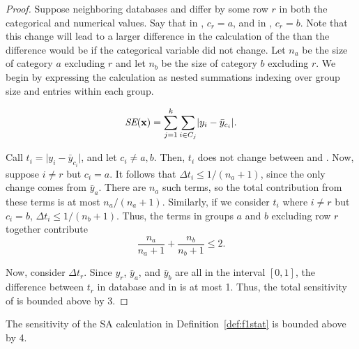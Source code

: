\begin{proof}

Suppose neighboring databases \x and \xprime differ by some row $r$ in both the categorical and numerical values. Say that in \x, $c_r = a$, and in \xprime, $c_r = b$. Note that this change will lead to a larger difference in the calculation of the \se than the difference would be if the categorical variable did not change. Let $n_a$ be the size of category $a$ excluding $r$ and let $n_b$ be the size of category $b$ excluding $r$. We begin by expressing the \se calculation as nested summations indexing over group size and entries within each group.

$$ \textit{SE}(\mathbf{x}) = \sum_{j=1}^k \sum_{i \in C_j}  \lvert y_{i} - \bar{y}_{c_i} \rvert. $$

Call $t_{i} = \lvert y_{i} - \bar{y}_{c_i} \rvert$, and let $c_i \neq a,b$. Then, $t_{i}$ does not change between \x and \xprime. Now, suppose $i \ne r$ but $c_i = a$. It follows that $\Delta t_{i} \le 1/(n_a+1)$, since the only change comes from $\bar{y}_{a}$. There are $n_a$ such terms, so the total contribution from these terms is at most $n_a/(n_a+1)$. Similarly, if we consider $t_{i}$ where $i \ne r$ but $c_i = b$, $\Delta t_{i} \le 1/(n_b+1)$. Thus, the terms in groups $a$ and $b$ excluding row $r$ together contribute 
$$ \frac{n_a}{n_a+1} + \frac{n_b}{n_b+1} \leq 2.$$

Now, consider $\Delta t_{r}$. Since $y_{r}$, $\bar{y}_{a}$, and $\bar{y}_b$ are all in the interval $[0,1]$, the difference between $t_{r}$ in database \x and in \xprime is at most 1. Thus, the total sensitivity of \se is bounded above by 3.

\end{proof}


\begin{theorem}[SA Sensitivity] \label{thm:SAsens}
The sensitivity of the SA calculation in Definition~\ref{def:f1stat} is bounded above by 4. 
\end{theorem}

